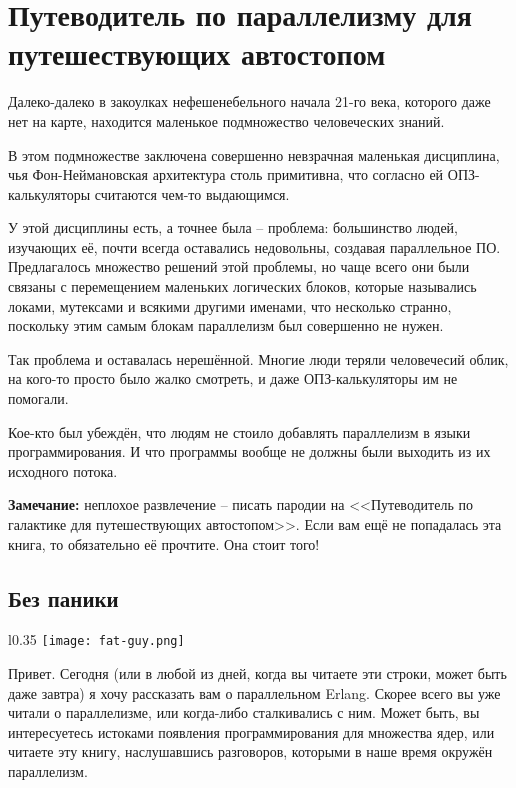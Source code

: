 \chapter{Путеводитель по параллелизму для путешествующих автостопом}
\label{the-hitchhikers-guide-to-concurrency}
Далеко\--далеко в закоулках нефешенебельного начала 21\--го века, которого даже нет на карте, находится маленькое подмножество человеческих знаний.

В этом подмножестве заключена совершенно невзрачная маленькая дисциплина, чья Фон\--Неймановская архитектура столь примитивна, что согласно ей ОПЗ\--калькуляторы считаются чем\--то выдающимся.

У этой дисциплины есть, а точнее была \--- проблема: большинство людей, изучающих её, почти всегда оставались недовольны, создавая параллельное ПО.
Предлагалось множество решений этой проблемы, но чаще всего они были связаны с перемещением маленьких логических блоков, которые назывались локами, мутексами и всякими другими именами, что несколько странно, поскольку этим самым блокам параллелизм был совершенно не нужен.

Так проблема и оставалась нерешённой.
Многие люди теряли человечесий облик, на кого-то просто было жалко смотреть, и даже ОПЗ\--калькуляторы им не помогали.

Кое\--кто был убеждён, что людям не стоило добавлять параллелизм в языки программирования.
И что программы вообще не должны были выходить из их исходного потока.
\\
\colorbox{lgray}
{
\begin{minipage}{1.0\linewidth}
    \textbf{Замечание:} неплохое развлечение \--- писать пародии на <<Путеводитель по галактике для путешествующих автостопом>>.
    Если вам ещё не попадалась эта книга, то обязательно её прочтите.
    Она стоит того!
\end{minipage}
}
\section{Без паники}
\label{dont-panic}
\begin{wrapfigure}{l}{0.35\linewidth}
    \texttt{[image: fat-guy.png]}
\end{wrapfigure}
Привет.
Сегодня (или в любой из дней, когда вы читаете эти строки, может быть даже завтра) я хочу рассказать вам о параллельном Erlang.
Скорее всего вы уже читали о параллелизме, или когда\--либо сталкивались с ним.
Может быть, вы интересуетесь истоками появления программирования для множества ядер, или читаете эту книгу, наслушавшись разговоров, которыми в наше время окружён параллелизм.

